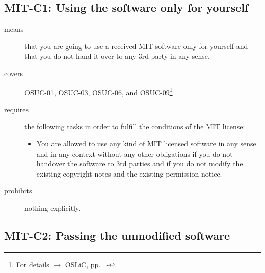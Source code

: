 \begin{center}
\begin{footnotesize}
{{{{{        }


      }
 
    }
   }   
}
\end{footnotesize}
\end{center}

\subsection{MIT-C1: Using the software only for yourself}
\label{OSUC-01-MIT} 
\label{OSUC-03-MIT} 
\label{OSUC-06-MIT}
\label{OSUC-09-MIT}
  
\begin{description}
\item[means] that you are going to use a received MIT software only for yourself
and that you do not hand it over to any 3rd party in any sense.
\item[covers] OSUC-01, OSUC-03, OSUC-06, and OSUC-09\footnote{For details $\rightarrow$ OSLiC, pp.\
  \pageref{OSUC-01-DEF} - \pageref{OSUC-09-DEF}}
\item[requires] the following tasks in order to fulfill the conditions
    of the MIT license:
  \begin{itemize}
    \item You are allowed to use any kind of MIT licensed software in any sense
    and in any context without any other obligations if you do not handover the
    software to 3rd parties and if you do not modify the existing copyright
    notes and the existing permission notice.
  \end{itemize}
\item[prohibits] nothing explicitly.
\end{description}

\subsection{MIT-C2: Passing the unmodified software}
\label{OSUC-02S-MIT} \label{OSUC-05S-MIT} \label{OSUC-07S-MIT} 
\label{OSUC-02B-MIT} \label{OSUC-05B-MIT} \label{OSUC-07B-MIT} 


